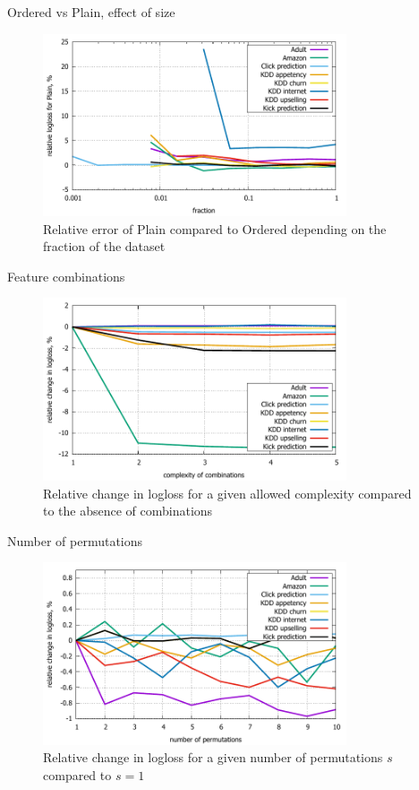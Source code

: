 \documentclass[pdf, 12pt, unicode]{beamer}
\newcommand{\1}{\mathbbm{1}}
\begin{document}
\begin{frame}{Ordered vs Plain, effect of size}

\begin{figure}
	\centering
	\includegraphics[width=0.8\textwidth]{plain_logloss.pdf}
	\caption{Relative error of Plain compared to Ordered depending on the fraction of the dataset}\label{fig:plain_filtered}
\end{figure}

\end{frame}
	
\begin{frame}{Feature combinations}
\begin{figure}
	\centering
	\includegraphics[width=0.8\textwidth]{complexity_logloss.pdf}
	\caption{Relative change in logloss for a given allowed complexity compared to the absence of combinations}\label{fig:combinations}
\end{figure}
\end{frame}
	
\begin{frame}{Number of permutations}
\begin{figure}
	\centering
	\includegraphics[width=0.8\textwidth]{folds_logloss.pdf}
	\caption{Relative change in logloss for a given number of permutations $s$ compared to $s=1$}\label{fig:folds}
\end{figure}
\end{frame}
\end{document}
